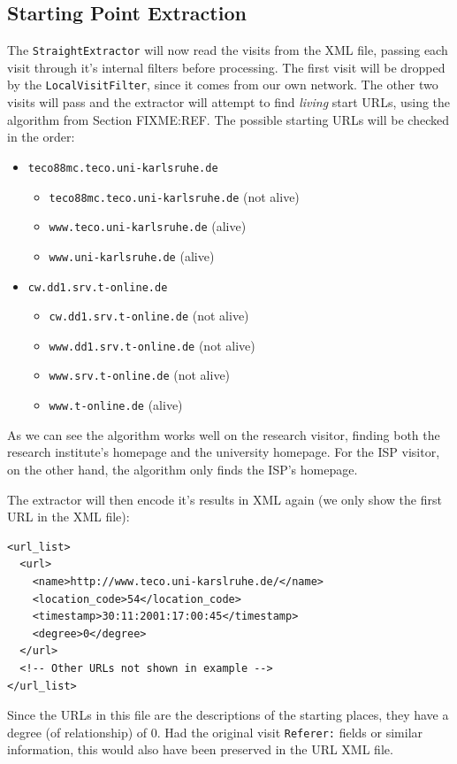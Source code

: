 \documentclass[a4paper]{danarticle}
\theoremstyle{remark}
\begin{document}
    \subsection{Starting Point Extraction}
      The \verb$StraightExtractor$ will now read the visits from the XML file,
      passing each visit through it's internal filters before processing. The
      first visit will be dropped by the \verb$LocalVisitFilter$, since it comes
      from our own network. The other two visits will pass and the extractor
      will attempt to find \textit{living} start URLs, using the algorithm from
      Section FIXME:REF. The possible starting URLs will be checked in the
      order:
      \begin{itemize}
        \item{\verb$teco88mc.teco.uni-karlsruhe.de$}
        \begin{itemize}
          \item{\verb$teco88mc.teco.uni-karlsruhe.de$ (not alive)}
          \item{\verb$www.teco.uni-karlsruhe.de$ (alive)}
          \item{\verb$www.uni-karlsruhe.de$ (alive)}
        \end{itemize}
        \item{\verb$cw.dd1.srv.t-online.de$}
        \begin{itemize}
          \item{\verb$cw.dd1.srv.t-online.de$ (not alive)}
          \item{\verb$www.dd1.srv.t-online.de$ (not alive)}
          \item{\verb$www.srv.t-online.de$ (not alive)}
          \item{\verb$www.t-online.de$ (alive)}
        \end{itemize}
      \end{itemize}
      As we can see the algorithm works well on the research visitor, finding
      both the research institute's homepage and the university homepage. For
      the ISP visitor, on the other hand, the algorithm only finds the ISP's
      homepage.
      
      The extractor will then encode it's results in XML again (we only show the
      first URL in the XML file):
      \begin{verbatim}
<url_list>
  <url> 
    <name>http://www.teco.uni-karslruhe.de/</name> 
    <location_code>54</location_code> 
    <timestamp>30:11:2001:17:00:45</timestamp> 
    <degree>0</degree> 
  </url> 
  <!-- Other URLs not shown in example --> 
</url_list>
      \end{verbatim}
      Since the URLs in this file are the descriptions of the starting places,
      they have a degree (of relationship) of 0. Had the original visit
      \verb$Referer:$  fields or similar information, this would also have been
      preserved in the URL XML file.
\end{document}
